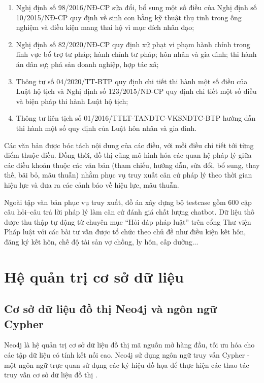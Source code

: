 \documentclass[../DoAn.tex]{subfiles}
\begin{document}
\begin{enumerate}
    \item Nghị định số 98/2016/NĐ-CP sửa đổi, bổ sung một số điều của Nghị định số 10/2015/NĐ-CP quy định về sinh con bằng kỹ thuật thụ tinh trong ống nghiệm và điều kiện mang thai hộ vì mục đích nhân đạo;
    \item Nghị định số 82/2020/NĐ-CP quy định xử phạt vi phạm hành chính trong lĩnh vực bổ trợ tư pháp; hành chính tư pháp; hôn nhân và gia đình; thi hành án dân sự; phá sản doanh nghiệp, hợp tác xã;
    \item Thông tư số 04/2020/TT-BTP quy định chi tiết thi hành một số điều của Luật hộ tịch và Nghị định số 123/2015/NĐ-CP quy định chi tiết một số điều và biện pháp thi hành Luật hộ tịch;
    \item Thông tư liên tịch số 01/2016/TTLT-TANDTC-VKSNDTC-BTP hướng dẫn thi hành một số quy định của Luật hôn nhân và gia đình.
\label{subsection:3.2-dataset-legal-list}
\end{enumerate}


Các văn bản được bóc tách nội dung của các điều, với mỗi điều chi tiết tới từng điểm thuộc điều. Đồng thời, đồ thị cũng mô hình hóa các quan hệ pháp lý giữa các điều khoản thuộc các văn bản (tham chiếu, hướng dẫn, sửa đổi, bổ sung, thay thế, bãi bỏ, mâu thuẫn) nhằm phục vụ truy xuất căn cứ pháp lý theo thời gian hiệu lực và đưa ra các cảnh báo về hiệu lực, mâu thuẫn.


Ngoài tập văn bản phục vụ truy xuất, đồ án xây dựng bộ testcase gồm 600 cặp câu hỏi--câu trả lời pháp lý làm căn cứ đánh giá chất lượng chatbot. Dữ liệu thô được thu thập tự động từ chuyên mục ``Hỏi đáp pháp luật'' trên cổng Thư viện Pháp luật \cite{ThuVienPhapLuatHoiDapDoc} với các bài tư vấn được tổ chức theo chủ đề như điều kiện kết hôn, đăng ký kết hôn, chế độ tài sản vợ chồng, ly hôn, cấp dưỡng...


\section{Hệ quản trị cơ sở dữ liệu}
\label{section:3.2}


\subsection{Cơ sở dữ liệu đồ thị Neo4j và ngôn ngữ Cypher}
\label{subsection:3.2.1}


Neo4j \cite{Neo4jDoc} là hệ quản trị cơ sở dữ liệu đồ thị mã nguồn mở hàng đầu, tối ưu hóa cho các tập dữ liệu có tính kết nối cao. Neo4j sử dụng ngôn ngữ truy vấn Cypher - một ngôn ngữ trực quan sử dụng các ký hiệu đồ họa để thực hiện các thao tác truy vấn cơ sở dữ liệu đồ thị \cite{10162641}.
\end{document}
